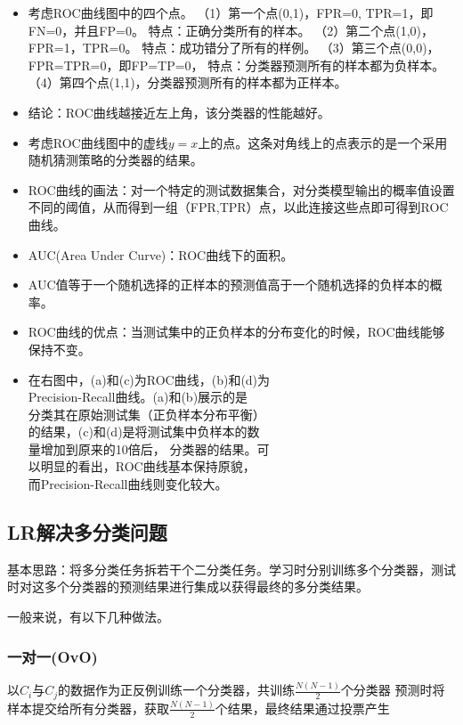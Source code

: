 \documentclass[10pt,a4paper]{ctexbook}
\begin{document}
\begin{itemize}

\item 考虑ROC曲线图中的四个点。
    \subitem（1）第一个点(0,1)，FPR=0, TPR=1，即FN=0，并且FP=0。
        \subsubitem 特点：正确分类所有的样本。
    \subitem（2）第二个点(1,0)，FPR=1，TPR=0。
        \subsubitem 特点：成功错分了所有的样例。
    \subitem（3）第三个点(0,0)，FPR=TPR=0，即FP=TP=0，
        \subsubitem 特点：分类器预测所有的样本都为负样本。
    \subitem（4）第四个点(1,1)，分类器预测所有的样本都为正样本。
\item 结论：ROC曲线越接近左上角，该分类器的性能越好。
\item 考虑ROC曲线图中的虚线$y=x$上的点。这条对角线上的点表示的是一个采用随机猜测策略的分类器的结果。

\item ROC曲线的画法：对一个特定的测试数据集合，对分类模型输出的概率值设置不同的阈值，从而得到一组（FPR,TPR）点，以此连接这些点即可得到ROC曲线。
\item AUC(Area Under Curve)：ROC曲线下的面积。
\item AUC值等于一个随机选择的正样本的预测值高于一个随机选择的负样本的概率。
\item ROC曲线的优点：当测试集中的正负样本的分布变化的时候，ROC曲线能够保持不变。

\item 在右图中，(a)和(c)为ROC曲线，(b)和(d)为\\
Precision-Recall曲线。(a)和(b)展示的是\\
分类其在原始测试集（正负样本分布平衡）\\
的结果，(c)和(d)是将测试集中负样本的数\\
量增加到原来的10倍后， 分类器的结果。可\\
以明显的看出，ROC曲线基本保持原貌，\\
而Precision-Recall曲线则变化较大。
\end{itemize}

\subsection{LR解决多分类问题}
基本思路：将多分类任务拆若干个二分类任务。学习时分别训练多个分类器，测试时对这多个分类器的预测结果进行集成以获得最终的多分类结果。

一般来说，有以下几种做法。

\subsubsection{一对一(OvO) }
以$C_{i}$与$C_{j}$的数据作为正反例训练一个分类器，共训练${\frac {N(N-1)}{2}}$个分类器
预测时将样本提交给所有分类器，获取${\frac {N(N-1)}{2}}$个结果，最终结果通过投票产生
\end{document}
